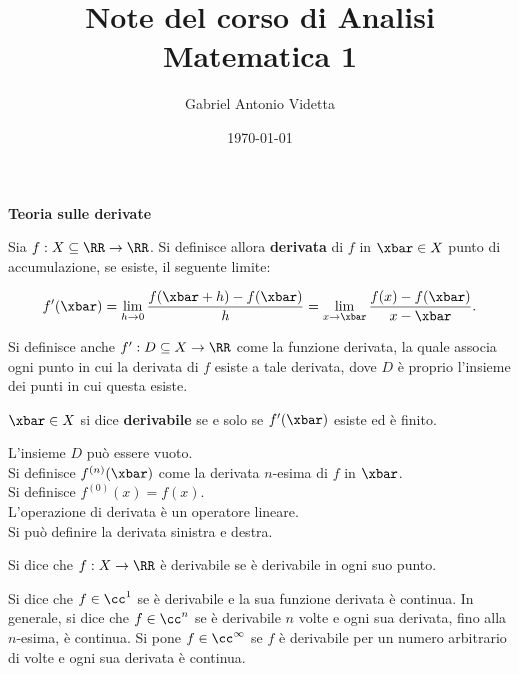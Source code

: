 \documentclass[11pt]{article}
\title{\textbf{Note del corso di Analisi Matematica 1}}
\author{Gabriel Antonio Videtta}
\date{\today}
\begin{document}
	
	\maketitle
	
	\wip
	
	\begin{center}
		\Large \textbf{Teoria sulle derivate}
	\end{center}

	\begin{definition}
		Sia $f : X \subseteq \RR \to \RR$. Si definisce allora \textbf{derivata}
		di $f$ in $\xbar \in X$ punto di accumulazione, se esiste, il seguente limite:
		
		\[f'(\xbar) = \lim_{h \to 0} \frac{f(\xbar + h) - f(\xbar)}{h} = \lim_{x \to \xbar} \frac{f(x) - f(\xbar)}{x - \xbar}.\]
		
		Si definisce anche $f' : D \subseteq X \to \RR$ come la funzione derivata,
		la quale associa ogni punto in cui la derivata di $f$ esiste a
		tale derivata, dove $D$ è proprio l'insieme dei punti in cui questa esiste.
	\end{definition}

	
	\begin{definition}
		$\xbar \in X$ si dice \textbf{derivabile} se e solo se $f'(\xbar)$ esiste ed è finito.
	\end{definition}
	
	\begin{remark}\nl
		\li L'insieme $D$ può essere vuoto. \\
		\li Si definisce $f^{(n)}(\xbar)$ come la derivata $n$-esima
		di $f$ in $\xbar$. \\
		\li Si definisce $f^{(0)}(x) = f(x)$. \\
		\li L'operazione di derivata è un operatore lineare. \\
		\li Si può definire la derivata sinistra e destra.
	\end{remark}

	\begin{definition}
		Si dice che $f : X \to \RR$ è derivabile se è derivabile in ogni
		suo punto.
	\end{definition}
	
	\begin{definition}
		Si dice che $f \in \cc^1$ se è derivabile e la sua
		funzione derivata è continua. In generale, si dice che $f \in \cc^n$ se
		è derivabile $n$ volte e ogni sua derivata, fino alla $n$-esima,
		è continua. Si pone $f \in \cc^\infty$ se $f$ è derivabile per un
		numero arbitrario di volte e ogni sua derivata è continua.
	\end{definition}
\end{document}
